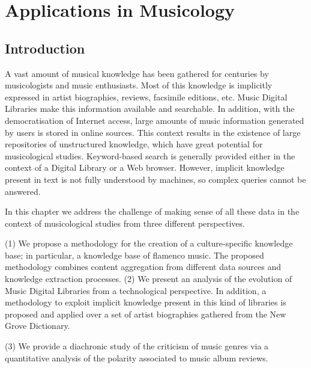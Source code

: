 
\chapter{Applications in Musicology}
\label{sec:musicology}

\section{Introduction}
\label{sec:musicology:introduction}

A vast amount of musical knowledge has been gathered for centuries by musicologists and music enthusiasts. Most of this knowledge is implicitly expressed in artist biographies, reviews, facsimile editions, etc. Music Digital Libraries make this information available and searchable. 
In addition, with the democratisation of Internet access, large amounts of music information generated by users is stored in online sources. This context results in the existence of large repositories of unstructured knowledge, which have great potential for musicological studies.
Keyword-based search is generally provided either in the context of a Digital Library or a Web browser. However, implicit knowledge present in text is not fully understood by machines, so complex queries cannot be answered. 

In this chapter we address the challenge of making sense of all these data in the context of musicological studies from three different perspectives. 

(1) 
We propose a methodology for the creation of a culture-specific knowledge base; in particular, a knowledge base of flamenco music. The proposed methodology combines content aggregation from different data sources and knowledge extraction processes. %
(2) 
We present an analysis of the evolution of Music Digital Libraries from a technological perspective. In addition, a methodology to exploit implicit knowledge present in this kind of libraries is proposed and applied over a set of artist biographies gathered from the New Grove Dictionary. 

(3)
We provide a diachronic study of the criticism of music genres via a quantitative analysis of the polarity associated to music album reviews. %

